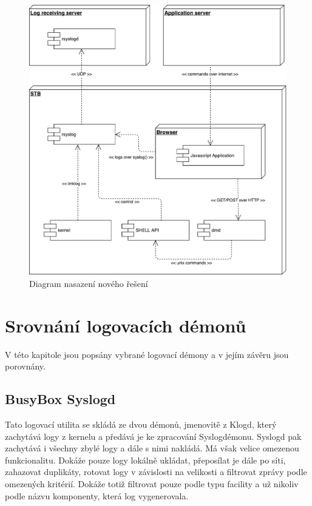 \documentclass[thesis=B,czech]{FITthesis}[2012/06/26]
\begin{document}
\begin{figure}[H]
	\centering
	\includegraphics[scale=0.5]{images/diagram-nasazeni-noveho-reseni}
	\caption[Diagram nasazení nového řešení]{Diagram nasazení nového řešení}
\end{figure}

\section{Srovnání logovacích démonů}
V této kapitole jsou popsány vybrané logovací démony a v jejím závěru jsou porovnány.
\subsection{BusyBox Syslogd}
Tato logovací utilita se skládá ze dvou démonů, jmenovitě z Klogd, který zachytává logy z kernelu a předává je ke zpracování Syslogdémonu. Syslogd pak zachytává i všechny zbylé logy a dále s nimi nakládá. Má však velice omezenou funkcionalitu. Dokáže pouze logy lokálně ukládat, přeposílat je dále po síti, zahazovat duplikáty, rotovat logy v závislosti na velikosti a filtrovat zprávy podle omezených kritérií. Dokáže totiž filtrovat pouze podle typu facility a už nikoliv podle názvu komponenty, která log vygenerovala.
\end{document}
